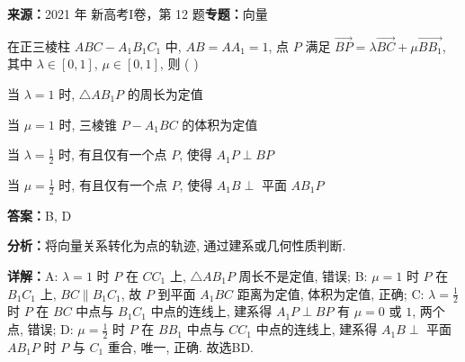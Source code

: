 \begin{question}[points=5]
\textbf{来源：}2021 年 新高考I卷，第 12 题\quad \textbf{专题：}向量\par
在正三棱柱 $ABC-A_1B_1C_1$ 中, $AB = AA_1 = 1$, 点 $P$ 满足 $\overrightarrow{BP} = \lambda \overrightarrow{BC} + \mu \overrightarrow{BB_1}$, 其中 $\lambda \in [0,1]$, $\mu \in [0,1]$, 则 ( )
\begin{choices}
  \item 当 $\lambda = 1$ 时, $\triangle AB_1P$ 的周长为定值
  \item 当 $\mu = 1$ 时, 三棱锥 $P-A_1BC$ 的体积为定值
  \item 当 $\lambda = \frac{1}{2}$ 时, 有且仅有一个点 $P$, 使得 $A_1P \perp BP$
  \item 当 $\mu = \frac{1}{2}$ 时, 有且仅有一个点 $P$, 使得 $A_1B \perp$ 平面 $AB_1P$
\end{choices}
\begin{solution}
\textbf{答案：}B, D

\textbf{分析：}将向量关系转化为点的轨迹, 通过建系或几何性质判断.

\textbf{详解：}A: $\lambda = 1$ 时 $P$ 在 $CC_1$ 上, $\triangle AB_1P$ 周长不是定值, 错误; B: $\mu = 1$ 时 $P$ 在 $B_1C_1$ 上, $BC \parallel B_1C_1$, 故 $P$ 到平面 $A_1BC$ 距离为定值, 体积为定值, 正确; C: $\lambda = \frac{1}{2}$ 时 $P$ 在 $BC$ 中点与 $B_1C_1$ 中点的连线上, 建系得 $A_1P \perp BP$ 有 $\mu=0$ 或 $1$, 两个点, 错误; D: $\mu = \frac{1}{2}$ 时 $P$ 在 $BB_1$ 中点与 $CC_1$ 中点的连线上, 建系得 $A_1B \perp$ 平面 $AB_1P$ 时 $P$ 与 $C_1$ 重合, 唯一, 正确. 故选BD.
\end{solution}
\end{question}

